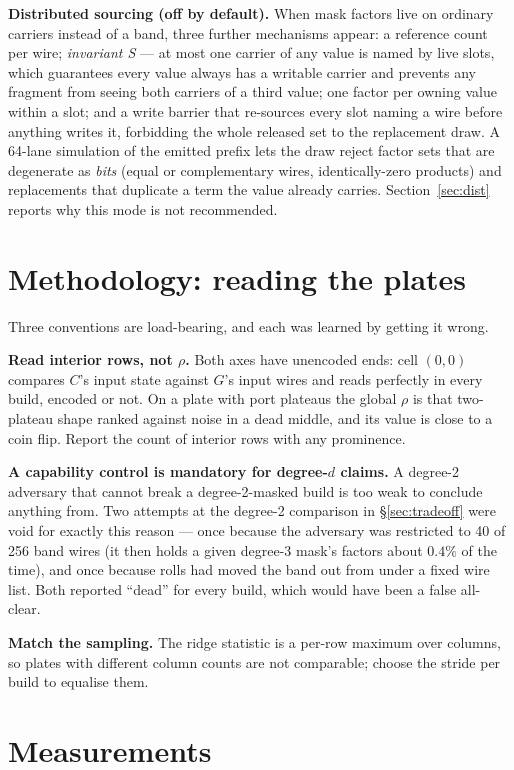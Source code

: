 \documentclass[11pt]{article}
\begin{document}
\textbf{Distributed sourcing (off by default).} When mask factors live on
ordinary carriers instead of a band, three further mechanisms appear: a
reference count per wire; \emph{invariant S} --- at most one carrier of any
value is named by live slots, which guarantees every value always has a
writable carrier and prevents any fragment from seeing both carriers of a third
value; one factor per owning value within a slot; and a write barrier that
re-sources every slot naming a wire before anything writes it, forbidding the
whole released set to the replacement draw. A 64-lane simulation of the emitted
prefix lets the draw reject factor sets that are degenerate as \emph{bits}
(equal or complementary wires, identically-zero products) and replacements that
duplicate a term the value already carries. Section~\ref{sec:dist} reports why
this mode is not recommended.

\section{Methodology: reading the plates}
\label{sec:method}

Three conventions are load-bearing, and each was learned by getting it wrong.

\textbf{Read interior rows, not $\rho$.} Both axes have unencoded ends: cell
$(0,0)$ compares $C$'s input state against $G$'s input wires and reads
perfectly in every build, encoded or not. On a plate with port plateaus the
global $\rho$ is that two-plateau shape ranked against noise in a dead middle,
and its value is close to a coin flip. Report the count of interior rows with
any prominence.

\textbf{A capability control is mandatory for degree-$d$ claims.} A
degree-2 adversary that cannot break a degree-2-masked build is too weak to
conclude anything from. Two attempts at the degree-2 comparison in
\S\ref{sec:tradeoff} were void for exactly this reason --- once because the
adversary was restricted to 40 of 256 band wires (it then holds a given
degree-3 mask's factors about $0.4\%$ of the time), and once because rolls had
moved the band out from under a fixed wire list. Both reported ``dead'' for
every build, which would have been a false all-clear.

\textbf{Match the sampling.} The ridge statistic is a per-row maximum over
columns, so plates with different column counts are not comparable; choose the
stride per build to equalise them.

\section{Measurements}
\end{document}
